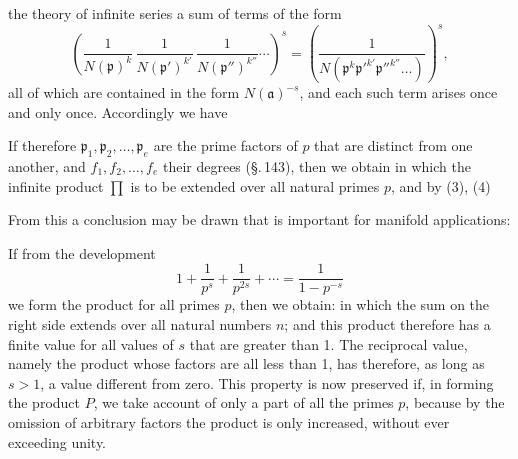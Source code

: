the theory of infinite series a sum of terms of the
form
\[
\left(\frac{1}{N(\mathfrak{p})^k}\,\frac{1}{N(\mathfrak{p}')^{k'}}\,\frac{1}{N(\mathfrak{p}'')^{k''}}\cdots\right)^s = \left(\frac{1}{N(\mathfrak{p}^k\mathfrak{p}'^{k'}\mathfrak{p}''^{k''}\dots)}\right)^s,
\]
all of which are contained in the form $N(\mathfrak{a})^{-s}$, and each such
term arises once and only once. Accordingly we have

If therefore $\mathfrak{p}_1, \mathfrak{p}_2, \dots, \mathfrak{p}_e$ are the prime factors of $p$ that are
distinct from one another, and $f_1, f_2, \dots, f_e$ their degrees (\S.\,143), then
we obtain
in which the infinite product $\prod$ is to be extended over all natural
 primes $p$, and by (3), (4)

From this a conclusion may be drawn that is important for
manifold applications:

If from the development
\[
1 + \frac{1}{p^s} + \frac{1}{p^{2s}} + \cdots = \frac{1}{1-p^{-s}}
\]
we form the product for all primes $p$, then we obtain:
in which the sum on the right side extends over all natural
numbers $n$; and this product therefore has a finite value for all
values of $s$ that are greater than 1. The reciprocal
value, namely the product
whose factors are all less than 1, has therefore, as
long as $s>1$, a value different from zero. This
property is now preserved if, in forming the
product $P$, we take account of only a part of all the primes $p$,
because by the omission of arbitrary factors the product is only
increased, without ever exceeding unity.
